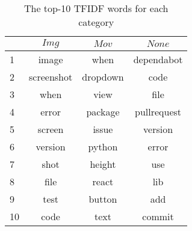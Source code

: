\begin{table}[t]
  \begin{center}
  \caption{The top-10 TFIDF words for each category}
  \begin{tabular}{l | c c c }
    \toprule
    & $Img$ & $Mov$ & $None$\\
    \midrule
    1 & image & when & dependabot\\
    2 & screenshot & dropdown & code\\
    3 & when & view & file\\
    4 & error & package & pullrequest\\
    5 & screen & issue & version\\
    6 & version & python & error\\
    7 & shot & height & use\\
    8 & file & react & lib\\
    9 & test & button & add\\
    10& code & text & commit\\
    \bottomrule
  \end{tabular}\\
  \label{tag:tfidf}
  \end{center}
\end{table}
